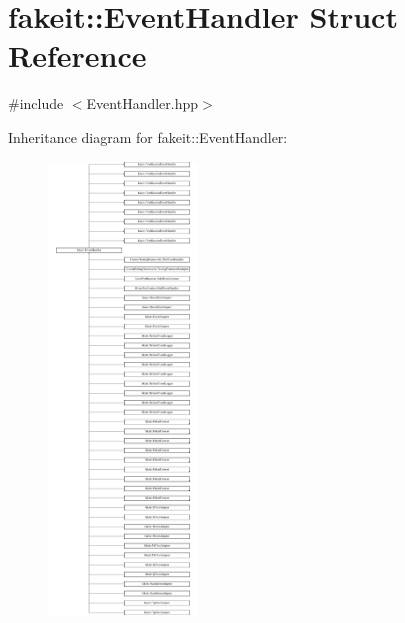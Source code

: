 \hypertarget{structfakeit_1_1EventHandler}{}\section{fakeit\+::Event\+Handler Struct Reference}
\label{structfakeit_1_1EventHandler}


{\ttfamily \#include $<$Event\+Handler.\+hpp$>$}

Inheritance diagram for fakeit\+::Event\+Handler\+:\begin{figure}[H]
\begin{center}
\leavevmode
\includegraphics[height=12.000000cm]{structfakeit_1_1EventHandler}
\end{center}
\end{figure}
